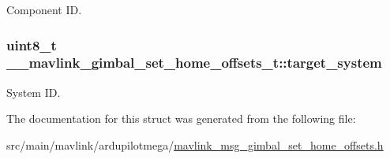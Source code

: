 Component I\+D. 

\hypertarget{struct____mavlink__gimbal__set__home__offsets__t_af34d0af5b9d3d20afaddeece2e3d799a}{
\subsubsection[{target\+\_\+system}]{\setlength{\rightskip}{0pt plus 5cm}uint8\+\_\+t \+\_\+\+\_\+mavlink\+\_\+gimbal\+\_\+set\+\_\+home\+\_\+offsets\+\_\+t\+::target\+\_\+system}}\label{struct____mavlink__gimbal__set__home__offsets__t_af34d0af5b9d3d20afaddeece2e3d799a}


System I\+D. 



The documentation for this struct was generated from the following file\+:\begin{DoxyCompactItemize}
\item 
src/main/mavlink/ardupilotmega/\hyperlink{mavlink__msg__gimbal__set__home__offsets_8h}{mavlink\+\_\+msg\+\_\+gimbal\+\_\+set\+\_\+home\+\_\+offsets.\+h}\end{DoxyCompactItemize}
